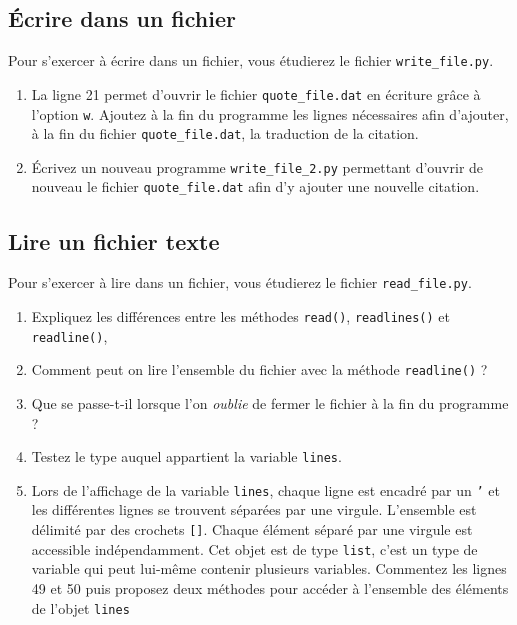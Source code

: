 
\subsection{Écrire dans un fichier}

Pour s'exercer à écrire dans un fichier, vous étudierez le fichier \texttt{write\_file.py}.

\begin{enumerate}

\item La ligne 21 permet d'ouvrir le fichier \texttt{quote\_file.dat} en écriture grâce
  à l'option \texttt{w}.
  Ajoutez à la fin du programme les lignes nécessaires afin d'ajouter, à la fin du
  fichier \texttt{quote\_file.dat}, la traduction de la citation.

\item   Écrivez   un  nouveau   programme   \texttt{write\_file\_2.py}
  permettant d'ouvrir  de nouveau le  fichier \texttt{quote\_file.dat}
  afin d'y ajouter une nouvelle citation.
    
\end{enumerate}

\subsection{Lire un fichier texte}

Pour  s'exercer à  lire dans  un  fichier, vous  étudierez le  fichier
\texttt{read\_file.py}.

\begin{enumerate}

\item Expliquez  les différences  entre les  méthodes \texttt{read()},
  \texttt{readlines()} et \texttt{readline()},

\item  Comment peut  on lire  l'ensemble  du fichier  avec la  méthode
  \texttt{readline()} ?

\item  Que se  passe-t-il lorsque  l'on \textit{oublie}  de fermer  le
  fichier à la fin du programme ?

\item Testez le type auquel appartient la variable \texttt{lines}.

\item Lors de l'affichage de  la variable \texttt{lines}, chaque ligne
  est encadré par un \texttt{'}  et les différentes lignes se trouvent
  séparées par une  virgule. L'ensemble est délimité  par des crochets
  \texttt{[]}.  Chaque  élément séparé par une  virgule est accessible
  indépendamment.  Cet objet est de  type \texttt{list}, c'est un type
  de  variable   qui  peut  lui-même  contenir   plusieurs  variables.
  Commentez  les lignes  49 et  50  puis proposez  deux méthodes  pour
  accéder à l'ensemble des éléments de l'objet \texttt{lines}

\end{enumerate}

